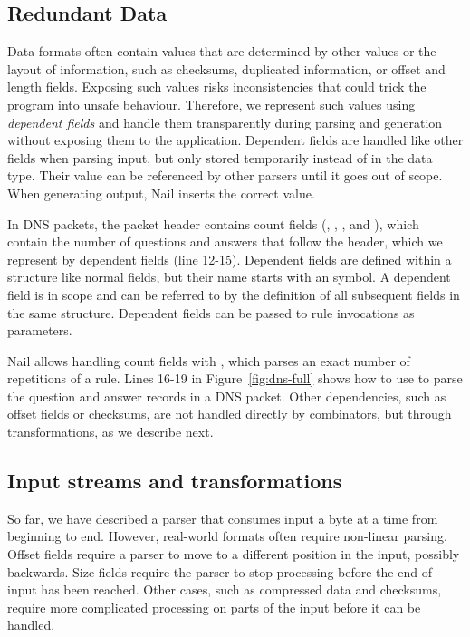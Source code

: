 


\subsection{Redundant Data}
\label{s:dependent}
Data formats often contain values that are determined by other values or the layout of information,
such as checksums, duplicated information, or offset and  length fields. Exposing such values risks
inconsistencies that could trick the program into unsafe behaviour. Therefore, we represent such values using \emph{dependent fields} and handle them transparently during
parsing and generation without exposing them to the application. 
Dependent fields are handled like other fields when parsing input, but only stored temporarily
instead of in the data type. Their value can be referenced by other parsers until it goes out of scope.
When generating output, Nail inserts the correct value.

In DNS packets, the packet header contains count fields (,
, , and ), which contain the number of questions and answers that follow the
header, which we represent by dependent fields (line 12-15).
Dependent fields are defined within a structure like normal fields, but their name starts with an  symbol.
A dependent field is in scope and can be referred to by the definition of all subsequent fields in
the same structure. Dependent fields can be passed to rule invocations as parameters.


Nail allows handling count fields with , which parses an exact number of repetitions of a rule. Lines 16-19 in Figure~\ref{fig:dns-full} shows how to use  to parse the question and
answer records in a DNS packet.
Other dependencies, such as offset fields or checksums, are not handled directly by combinators, but
through  transformations, as we describe next.

\subsection{Input streams and transformations}
\label{s:transforms}
So far, we have described a parser that consumes input a byte at a time from beginning to end.
However, real-world formats often require non-linear parsing. Offset fields require a parser to move
to a different position in the input, possibly backwards. Size fields require the parser to stop
processing before the end of input has been reached.
Other cases, such as compressed data and checksums, require more complicated processing on parts of the input
before it can be handled.


